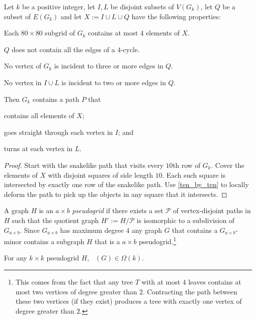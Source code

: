 \documentclass{patmorin}
\DeclareMathOperator{\chilin}{\chi_{\mathrm{lin}}}
\begin{document}
\begin{lem}
  Let $k$ be a positive integer, let $I,L$ be disjoint subsets of $V(G_{k})$, let $Q$ be a subset of $E(G_{k})$ and let $X:=I\cup L\cup Q$ have the following properties:
  \begin{compactenum}[(Pr1)]\setcounter{enumi}{0}
    \item Each $80\times 80$ subgrid of $G_k$ contains at most $4$ elements of $X$.
    \item $Q$ does not contain all the edges of a $4$-cycle.
    \item No vertex of $G_k$ is incident to three or more edges in $Q$.
    \item No vertex in $I\cup L$ is incident to two or more edges in $Q$.
  \end{compactenum}
  Then $G_k$ contains a path $P$ that
  \begin{compactenum}
    \item contains all elements of $X$;
    \item goes straight through each vertex in $I$; and
    \item turns at each vertex in $L$.
  \end{compactenum}
\end{lem}

\begin{proof}
  Start with the snakelike path that visits every $10$th row of $G_k$. Cover the elements of $X$ with disjoint squares of side length $10$.  Each such square is intersected by exactly one row of the snakelike path.  Use \cref{ten_by_ten} to locally deform the path to pick up the objects in any square that it intersects.
\end{proof}

A graph $H$ is an $a\times b$ \emph{pseudogrid} if there exists a set $\mathcal{P}$ of vertex-disjoint paths in $H$ such that the quotient graph $H':=H/\mathcal{P}$ is isomorphic to a subdivision of $G_{a\times b}$.  Since $G_{a\times b}$ has maximum degree $4$ any graph $G$ that contains a $G_{a\times b}$-minor contains a subgraph $H$ that is a $a\times b$ pseudogrid.\footnote{This comes from the fact that any tree $T$ with at most $4$ leaves contains at most two vertices of degree greater than $2$.  Contracting the path between these two vertices (if they exist) produces a tree with exactly one vertex of degree greater than $2$.}

\begin{lem}
  For any $k\times k$ pseudogrid $H$, $\chilin(G)\in\Omega(k)$.
\end{lem}
\end{document}
